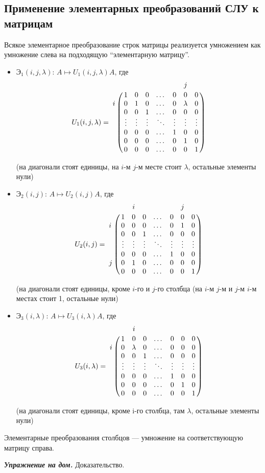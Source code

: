 \subsection{Применение элементарных преобразований СЛУ к матрицам}

Всякое элементарное преобразование строк матрицы реализуется умножением как умножение слева на подходящую ``элементарную матрицу''.

\begin{itemize}
\item 
    $\text{Э}_1(i, j, \lambda)$: $A \mapsto U_1(i, j, \lambda)A$, где
    \begin{equation*}
        U_1(i, j, \lambda) = \bordermatrix{
            &   &   &   &   &   & j &   \cr
            & 1 & 0 & 0 & \dots & 0 & 0 & 0 \cr
          i & 0 & 1 & 0 & \dots & 0 & \lambda & 0 \cr
            & 0 & 0 & 1 & \dots & 0 & 0 & 0 \cr
            & \vdots & \vdots & \vdots & \ddots & \vdots & \vdots & \vdots \cr
            & 0 & 0 & 0 & \dots & 1 & 0 & 0 \cr
            & 0 & 0 & 0 & \dots & 0 & 1 & 0 \cr
            & 0 & 0 & 0 & \dots & 0 & 0 & 1
        }
    \end{equation*}

    (на диагонали стоят единицы, на $i$-м $j$-м месте стоит $\lambda$, остальные элементы нули)

\item

    $\text{Э}_2(i, j)$: $A \mapsto U_2(i, j)A$, где
    \begin{equation*}
        U_2(i, j) = \bordermatrix{
            &   & i &   &   &   & j &   \cr
            & 1 & 0 & 0 & \dots & 0 & 0 & 0 \cr
          i & 0 & 0 & 0 & \dots & 0 & 1 & 0 \cr
            & 0 & 0 & 1 & \dots & 0 & 0 & 0 \cr
            & \vdots & \vdots & \vdots & \ddots & \vdots & \vdots & \vdots \cr
            & 0 & 0 & 0 & \dots & 1 & 0 & 0 \cr
          j & 0 & 1 & 0 & \dots & 0 & 0 & 0 \cr
            & 0 & 0 & 0 & \dots & 0 & 0 & 1
        }
    \end{equation*}

    (на диагонали стоят единицы, кроме $i$-го и $j$-го столбца (на $i$-м $j$-м и $j$-м $i$-м местах стоит 1, остальные нули)

\item 
    $\text{Э}_3(i, \lambda)$: $A \mapsto U_3(i, \lambda)A$, где
    \begin{equation*}
        U_3(i, \lambda) = \bordermatrix{    
            &   & i &   &   &   &   &   \cr
            & 1 & 0 & 0 & \dots & 0 & 0 & 0 \cr
          i & 0 & \lambda & 0 & \dots & 0 & 0 & 0 \cr
            & 0 & 0 & 1 & \dots & 0 & 0 & 0 \cr
            & \vdots & \vdots & \vdots & \ddots & \vdots & \vdots & \vdots \cr
            & 0 & 0 & 0 & \dots & 1 & 0 & 0 \cr
            & 0 & 0 & 0 & \dots & 0 & 1 & 0 \cr
            & 0 & 0 & 0 & \dots & 0 & 0 & 1
        }
    \end{equation*}

    (на диагонали стоят единицы, кроме i-го столбца, там $\lambda$, остальные элементы нули)
\end{itemize}

Элементарные преобразования столбцов --- умножение на соответствующую матрицу справа.

\bigskip
\textit{\textbf{Упражнение на дом.}} Доказательство.
